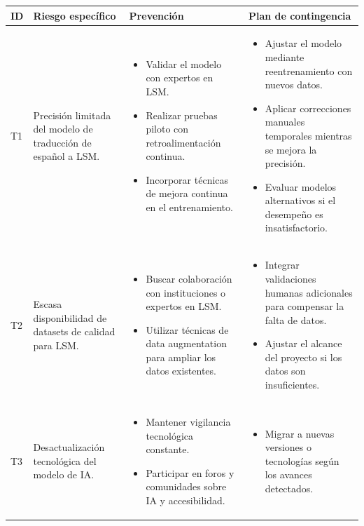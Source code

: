 \begin{longtable}{|>{\centering\arraybackslash}p{0.8cm}|>{\raggedright\arraybackslash}p{3.5cm}|>{\raggedright\arraybackslash}p{5.1cm}|>{\raggedright\arraybackslash}p{5.1cm}|}
	\hline
	\textbf{ID} & \textbf{Riesgo específico} & \textbf{Prevención} & \textbf{Plan de contingencia} \\
	\hline
	T1 & Precisión limitada del modelo de traducción de español a LSM. &
	\begin{itemize}
		\item Validar el modelo con expertos en LSM.
		\item Realizar pruebas piloto con retroalimentación continua.
		\item Incorporar técnicas de mejora continua en el entrenamiento.
	\end{itemize} &
	\begin{itemize}
		\item Ajustar el modelo mediante reentrenamiento con nuevos datos.
		\item Aplicar correcciones manuales temporales mientras se mejora la precisión.
		\item Evaluar modelos alternativos si el desempeño es insatisfactorio.
	\end{itemize} \\
	\hline
	T2 & Escasa disponibilidad de datasets de calidad para LSM. &
	\begin{itemize}
		\item Buscar colaboración con instituciones o expertos en LSM.
		\item Utilizar técnicas de data augmentation para ampliar los datos existentes.
	\end{itemize} &
	\begin{itemize}
		\item Integrar validaciones humanas adicionales para compensar la falta de datos.
		\item Ajustar el alcance del proyecto si los datos son insuficientes.
	\end{itemize} \\
	\hline
	T3 & Desactualización tecnológica del modelo de IA. &
	\begin{itemize}
		\item Mantener vigilancia tecnológica constante.
		\item Participar en foros y comunidades sobre IA y accesibilidad.
	\end{itemize} &
	\begin{itemize}
		\item Migrar a nuevas versiones o tecnologías según los avances detectados.

\end{itemize}
\end{longtable}
